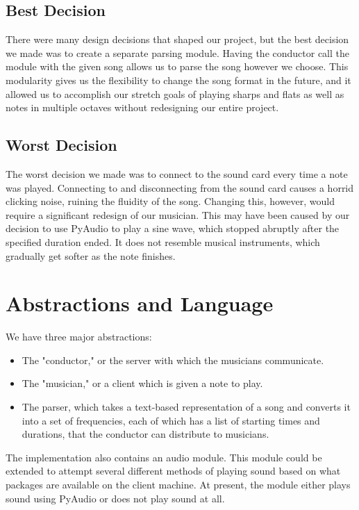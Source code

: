 \documentclass[12pt, letterpaper]{article}
\begin{document}
\subsection{Best Decision}
There were many design decisions that shaped our project, but the best decision we made was to
create a separate parsing module. Having the conductor call the module with the given song allows
us to parse the song however we choose. This modularity gives us the flexibility to change the
song format in the future, and it allowed us to accomplish our stretch goals of playing sharps and
flats as well as notes in multiple octaves without redesigning our entire project.

\subsection{Worst Decision}
The worst decision we made was to connect to the sound card every time a note was played.
Connecting to and disconnecting from the sound card causes a horrid clicking noise, ruining the
fluidity of the song. Changing this, however, would require a significant redesign of our musician.
This may have been caused by our decision to use PyAudio to play a sine wave, which stopped abruptly
after the specified duration ended. It does not resemble musical instruments, which gradually get
softer as the note finishes.


\section{Abstractions and Language} We have three major abstractions:

\begin{itemize}
\item The "conductor," or the server with which the musicians communicate.
\item The "musician," or a client which is given a note to play.
\item The parser, which takes a text-based representation of a song and converts it into a set of
frequencies, each of which has a list of starting times and durations, that the conductor can
distribute to musicians.
\end{itemize}

The implementation also contains an audio module. This module could be extended to attempt several
different methods of playing sound based on what packages are available on the client machine. At
present, the module either plays sound using PyAudio or does not play sound at all.
\end{document}
